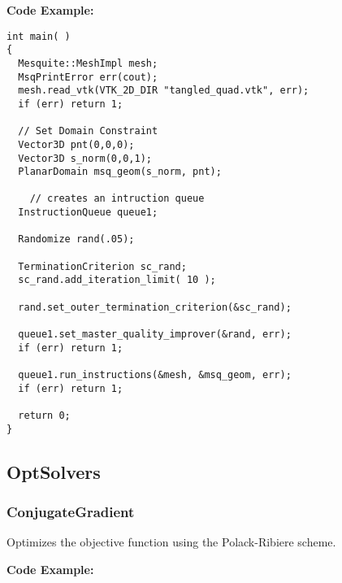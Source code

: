 \textbf{Code Example:}

\begin{lstlisting}[frame=single]
int main( )
{
  Mesquite::MeshImpl mesh;
  MsqPrintError err(cout);
  mesh.read_vtk(VTK_2D_DIR "tangled_quad.vtk", err);
  if (err) return 1;
  
  // Set Domain Constraint
  Vector3D pnt(0,0,0);
  Vector3D s_norm(0,0,1);
  PlanarDomain msq_geom(s_norm, pnt);
                                                                              
    // creates an intruction queue
  InstructionQueue queue1;
  
  Randomize rand(.05);
  
  TerminationCriterion sc_rand;
  sc_rand.add_iteration_limit( 10 );
 
  rand.set_outer_termination_criterion(&sc_rand);
  
  queue1.set_master_quality_improver(&rand, err);
  if (err) return 1;

  queue1.run_instructions(&mesh, &msq_geom, err);
  if (err) return 1;
  
  return 0;
}
\end{lstlisting}


\subsection{OptSolvers}

\subsubsection{ConjugateGradient}

Optimizes the objective function using the Polack-Ribiere scheme.

\textbf{Code Example:}

